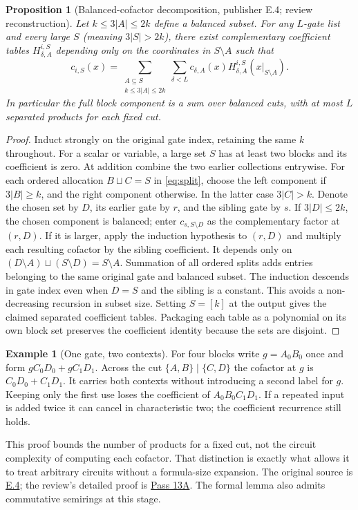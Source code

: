 \documentclass[11pt,letterpaper]{article}
\newtheorem{proposition}[theorem]{Proposition}
\theoremstyle{definition}\newtheorem{definition}[theorem]{Definition}\newtheorem{example}[theorem]{Example}
\theoremstyle{remark}\newtheorem{remark}[theorem]{Remark}
\newcommand{\pub}[3]{\href{https://github.com/anthropics/formal-math/blob/11b6c7e3c927df2658f513b6b68ea7f8929c62c5/vp-vnp/#1\#L#2}{#3}}
\newcommand{\aud}[2]{\href{https://github.com/nousentllc/VP-VNP-Review/blob/567303d0bcf4f9d54390437b137752446e58ccd6/#1}{#2}}
\begin{document}
\begin{proposition}[Balanced-cofactor decomposition, publisher E.4; review reconstruction]\label{prop:balanced}
Let $k\le3|A|\le2k$ define a balanced subset. For any $L$-gate list and every large $S$ (meaning $3|S|>2k$), there exist complementary coefficient tables $H^{i,S}_{\delta,A}$ depending only on the coordinates in $S\setminus A$ such that
\begin{equation}\label{eq:cofactor}
 c_{i,S}(x)=\sum_{\substack{A\subseteq S\\k\le3|A|\le2k}}\sum_{\delta<L}
 c_{\delta,A}(x)H^{i,S}_{\delta,A}(x|_{S\setminus A}).
\end{equation}
In particular the full block component is a sum over balanced cuts, with at most $L$ separated products for each fixed cut.
\end{proposition}
\begin{proof}
Induct strongly on the original gate index, retaining the same $k$ throughout. For a scalar or variable, a large set $S$ has at least two blocks and its coefficient is zero. At addition combine the two earlier collections entrywise. For each ordered allocation $B\sqcup C=S$ in \eqref{eq:split}, choose the left component if $3|B|\ge k$, and the right component otherwise. In the latter case $3|C|>k$. Denote the chosen set by $D$, its earlier gate by $r$, and the sibling gate by $s$. If $3|D|\le2k$, the chosen component is balanced; enter $c_{s,S\setminus D}$ as the complementary factor at $(r,D)$. If it is larger, apply the induction hypothesis to $(r,D)$ and multiply each resulting cofactor by the sibling coefficient. It depends only on $(D\setminus A)\sqcup(S\setminus D)=S\setminus A$. Summation of all ordered splits adds entries belonging to the same original gate and balanced subset. The induction descends in gate index even when $D=S$ and the sibling is a constant. This avoids a non-decreasing recursion in subset size. Setting $S=[k]$ at the output gives the claimed separated coefficient tables. Packaging each table as a polynomial on its own block set preserves the coefficient identity because the sets are disjoint.
\end{proof}
\begin{example}[One gate, two contexts]
For four blocks write $g=A_0B_0$ once and form $gC_0D_0+gC_1D_1$. Across the cut $\{A,B\}\mid\{C,D\}$ the cofactor at $g$ is $C_0D_0+C_1D_1$. It carries both contexts without introducing a second label for $g$. Keeping only the first use loses the coefficient of $A_0B_0C_1D_1$. If a repeated input is added twice it can cancel in characteristic two; the coefficient recurrence still holds.
\end{example}
This proof bounds the number of products for a fixed cut, not the circuit complexity of computing each cofactor. That distinction is exactly what allows it to treat arbitrary circuits without a formula-size expansion. The original source is \pub{Paper/Flat.lean}{229}{E.4}; the review's detailed proof is \aud{passes/pass13A-gate-reuse.md}{Pass 13A}. The formal lemma also admits commutative semirings at this stage.
\end{document}
